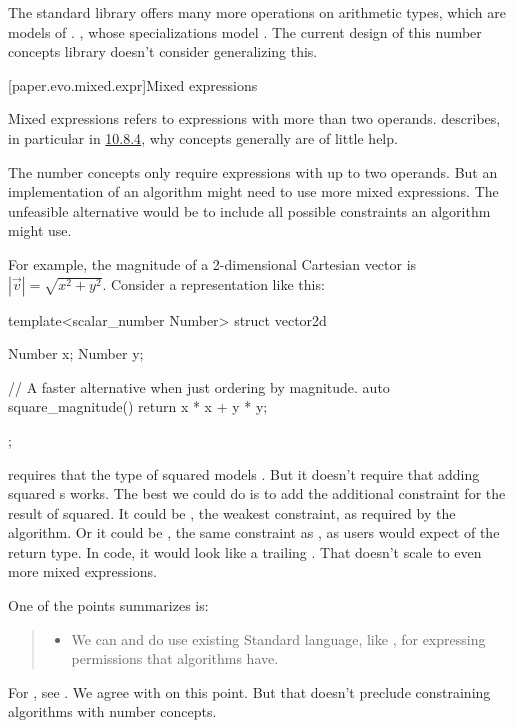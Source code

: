 \pnum
The \Cpp{} standard library offers many more operations on arithmetic types,
which are models of .
,
whose specializations model .
The current design of this number concepts library doesn't consider generalizing this.

\pnum
\wheredevelisat

[paper.evo.mixed.expr]{Mixed expressions}

\pnum
Mixed expressions refers to expressions with more than two operands.
\hrefVI{} describes,
in particular in \href{https://wg21.link/P1673R12#generalizing-associativity-helps-little}{10.8.4},
why concepts generally are of little help.

\pnum
The number concepts only require expressions with up to two operands.
But an implementation of an algorithm might need to use more mixed expressions.
The unfeasible alternative would be to include all possible constraints an algorithm might use.

\pnum
For example, the magnitude of a 2-dimensional Cartesian vector is $|\vec{v}| = \sqrt{x^2 + y^2}$.
Consider a \Cpp{} representation like this:
\begin{codeblock}
template<scalar_number Number>
struct vector2d {
  Number x;
  Number y;

  // A faster alternative when just ordering by magnitude.
  auto square_magnitude() { return x * x + y * y; }
};
\end{codeblock}
 requires that the type of  squared models .
But it doesn't require that adding squared s works.
The best we could do is to add the additional constraint for the result of  squared.
It could be , the weakest constraint, as required by the algorithm.
Or it could be , the same constraint as , as users would expect of the return type.
In code, it would look like a trailing .
That doesn't scale to even more mixed expressions.

\pnum
One of the points \hrefVI{} summarizes is:
\begin{quote}
\begin{itemize}
\item
We can and do use existing Standard language, like ,
for expressing permissions that algorithms have.
\end{itemize}
\end{quote}
For , see .
We agree with \hrefVI{} on this point.
But that doesn't preclude constraining algorithms with number concepts.

